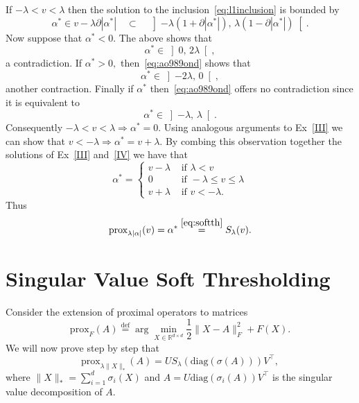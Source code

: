 \documentclass[11pt]{article}
\newcommand{\R}{\mathbb{R}}
\newcommand{\eqdef}{\overset{\text{def}}{=}}
\newcommand{\norm}[1]{\lVert#1\rVert}
\begin{document}
\begin{ExerciseList}
\Answer[ref={IV}]    If $-\lambda < v < \lambda$ then the solution to the inclusion~\eqref{eq:l1inclusion} is bounded by
    \begin{equation}\label{eq:ao989ond}
    \alpha^* \in v - \lambda \partial |\alpha^*| \quad \subset \quad\left]-\lambda (1+\partial |\alpha^*|), \,  \lambda (1-\partial |\alpha^*|) \right[.\end{equation}
     Now suppose that $\alpha^* <0$. The above shows that 
     \[\alpha^* \in \left] 0, \,  2\lambda  \right[, \]
     a contradiction. If $\alpha^* >0,$ then~\eqref{eq:ao989ond} shows that 
     \[ \alpha^* \in \left] -2\lambda, \,  0  \right[, \]
     another contraction. Finally if $\alpha^*$ then~\eqref{eq:ao989ond}  offers no contradiction since it is equivalent to 
          \[ \alpha^* \in \left] -\lambda, \,  \lambda  \right[. \]
     Consequently $-\lambda < v < \lambda \Rightarrow \alpha^* =0. $
     \Answer[ref={V}] Using analogous arguments to Ex~\ref{III} we can show that  $v < -\lambda \Rightarrow \alpha^* = v+ \lambda.$ By combing this observation together the solutions of Ex~\ref{III} and~\ref{IV} we have that
      \[\alpha^*= 
\begin{cases}
v- \lambda & \mbox{ if } \lambda <v\\
0 & \mbox{ if } -\lambda\leq v\leq \lambda\\
v+\lambda & \mbox{ if } v<  -\lambda.
\end{cases}\]
Thus 
\[\mbox{prox}_{\lambda |\alpha|}(v) = \alpha^* \overset{\eqref{eq:softth}}{ =} S_{\lambda}(v).\]
\end{ExerciseList}

 \section{Singular Value Soft Thresholding}
 Consider the extension of proximal operators to matrices
   \begin{equation}
  \mbox{prox}_{F}(A) \eqdef \arg\min_{X \in \R^{d\times d}} \frac{1}{2}\norm{X-A}_F^2 + F(X).
  \end{equation}
 We will now prove step by step that
  \begin{equation}\label{eq:l1prox}
  \mbox{prox}_{\lambda \norm{X}_*} (A) = U S_{\lambda}(\mbox{diag}(\sigma(A)))V^\top,
  \end{equation}
  where $\norm{X}_* = \sum_{i=1}^d \sigma_i(X)$ and $A=U\mbox{diag}(\sigma_i(A))V^\top$ is the singular value decomposition of $A.$
     
\end{document}
